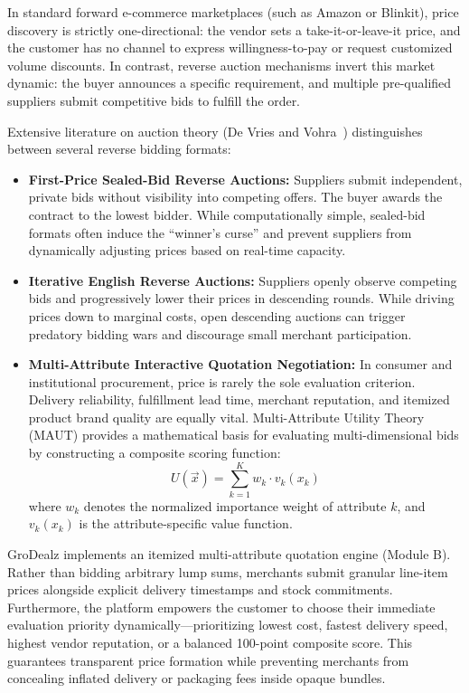 In standard forward e-commerce marketplaces (such as Amazon or Blinkit), price discovery is strictly one-directional: the vendor sets a take-it-or-leave-it price, and the customer has no channel to express willingness-to-pay or request customized volume discounts. In contrast, reverse auction mechanisms invert this market dynamic: the buyer announces a specific requirement, and multiple pre-qualified suppliers submit competitive bids to fulfill the order.

Extensive literature on auction theory (De Vries and Vohra~\cite{de2003combinatorial}) distinguishes between several reverse bidding formats:
\begin{itemize}
    \item \textbf{First-Price Sealed-Bid Reverse Auctions:} Suppliers submit independent, private bids without visibility into competing offers. The buyer awards the contract to the lowest bidder. While computationally simple, sealed-bid formats often induce the ``winner's curse'' and prevent suppliers from dynamically adjusting prices based on real-time capacity.
    \item \textbf{Iterative English Reverse Auctions:} Suppliers openly observe competing bids and progressively lower their prices in descending rounds. While driving prices down to marginal costs, open descending auctions can trigger predatory bidding wars and discourage small merchant participation.
    \item \textbf{Multi-Attribute Interactive Quotation Negotiation:} In consumer and institutional procurement, price is rarely the sole evaluation criterion. Delivery reliability, fulfillment lead time, merchant reputation, and itemized product brand quality are equally vital. Multi-Attribute Utility Theory (MAUT) provides a mathematical basis for evaluating multi-dimensional bids by constructing a composite scoring function:
    \begin{equation}
        U(\vec{x}) = \sum_{k=1}^{K} w_k \cdot v_k(x_k)
    \end{equation}
    where $w_k$ denotes the normalized importance weight of attribute $k$, and $v_k(x_k)$ is the attribute-specific value function.
\end{itemize}

GroDealz implements an itemized multi-attribute quotation engine (Module B). Rather than bidding arbitrary lump sums, merchants submit granular line-item prices alongside explicit delivery timestamps and stock commitments. Furthermore, the platform empowers the customer to choose their immediate evaluation priority dynamically---prioritizing lowest cost, fastest delivery speed, highest vendor reputation, or a balanced 100-point composite score. This guarantees transparent price formation while preventing merchants from concealing inflated delivery or packaging fees inside opaque bundles.

